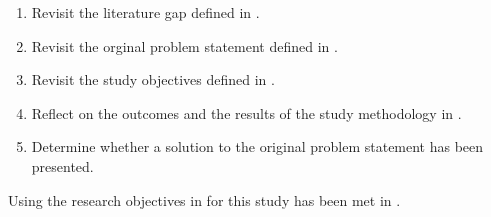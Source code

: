 \begin{enumerate}[label=\textbf{\Roman*.}]
	\item Revisit the literature gap defined in .
	\item Revisit the orginal problem statement defined in .
	\item Revisit the study objectives defined in .
	\item Reflect on the outcomes and the results of the study methodology in .
	\item Determine whether a solution to the original problem statement has been presented. 
\end{enumerate}

Using the research objectives in  for this study has been met in . 

